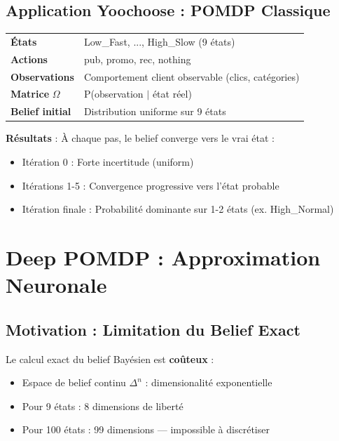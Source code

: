 \documentclass[11pt,a4paper]{article}
\begin{document}
\subsection{Application Yoochoose : POMDP Classique}
 
\begin{center}
\begin{tabularx}{0.8\linewidth}{|l|X|}
\hline
\textbf{États} & Low\_Fast, ..., High\_Slow (9 états) \\
\textbf{Actions} & pub, promo, rec, nothing \\
\textbf{Observations} & Comportement client observable (clics, catégories) \\
\textbf{Matrice} $\Omega$ & P(observation $\mid$ état réel) \\
\textbf{Belief initial} & Distribution uniforme sur 9 états \\
\hline
\end{tabularx}
\end{center}
 
\textbf{Résultats} : À chaque pas, le belief converge vers le vrai état :
\begin{itemize}
  \item Itération 0 : Forte incertitude (uniform)
  \item Itérations 1-5 : Convergence progressive vers l'état probable
  \item Itération finale : Probabilité dominante sur 1-2 états (ex. High\_Normal)
\end{itemize}
\newpage
 
\section{Deep POMDP : Approximation Neuronale}
 
\subsection{Motivation : Limitation du Belief Exact}
 
Le calcul exact du belief Bayésien est \textbf{coûteux} :
\begin{itemize}
  \item Espace de belief continu $\Delta^n$ : dimensionalité exponentielle
  \item Pour 9 états : 8 dimensions de liberté
  \item Pour 100 états : 99 dimensions — impossible à discrétiser
\end{itemize}
 
\end{document}
